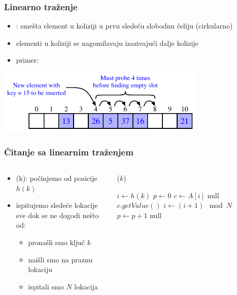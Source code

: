 \documentclass[compress]{beamer}
\begin{document}
\begin{frame}[fragile]
  \frametitle{Linearno traženje}
  \begin{itemize}
    \item {}: smešta element u koliziji u prvu sledeću slobodnu ćeliju (cirkularno)
    \item elementi u koliziji se nagomilavaju izazivajući dalje kolizije
    \item primer:
  \end{itemize}
  \begin{center}
    \includegraphics[width=10cm]{asp-10-pic09.pdf}
  \end{center}
\end{frame}

\begin{frame}[fragile]
  \frametitle{Čitanje sa linearnim traženjem}
  \begin{columns}
    \begin{column}[c]{6cm}
      \begin{itemize}
        \item {}(k): počinjemo od pozicije $h(k)$
        \item ispitujemo sledeće lokacije sve dok se ne dogodi nešto od:
        \begin{itemize}
          \item pronašli smo ključ $k$
          \item naišli smo na praznu lokaciju
          \item ispitali smo $N$ lokacija
        \end{itemize}
      \end{itemize}
    \end{column}
    \begin{column}[c]{5cm}
      ($k$)
      \begin{algorithmic}
        \small
        \STATE $i \leftarrow h(k)$
        \STATE $p \leftarrow 0$
        \REPEAT
          \STATE $c \leftarrow A[i]$
            \RETURN null
          \ELSE 
              \RETURN $c.getValue()$
            \ELSE
              \STATE $i \leftarrow (i+1)\mod N$
              \STATE $p \leftarrow p+1$
            \ENDIF
          \ENDIF
        \RETURN null
      \end{algorithmic}
    \end{column}
  \end{columns}
\end{frame}
\end{document}
